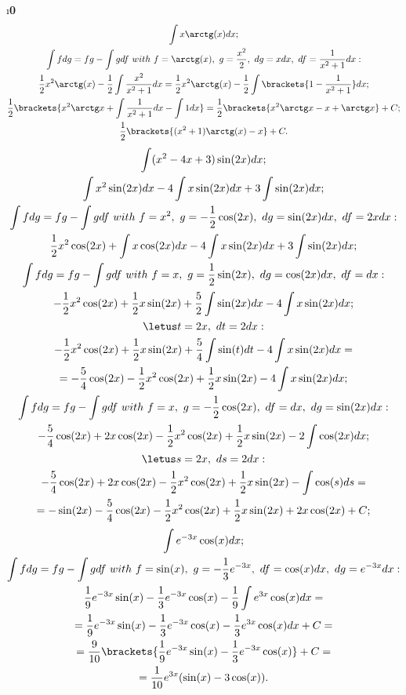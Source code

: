 \i \textbf{0}
\pu
\begin{gather*}
    \int x\arctg(x)dx;\\
    \int f dg = fg - \int g df\ with\ f=\arctg(x),\ g = \frac{x^2}{2},\ dg = xdx,\ df = \frac{1}{x^2+1}dx:\\
    \frac{1}{2}x^2\arctg(x) - \frac{1}{2}\int \frac{x^2}{x^2+1}dx = \frac{1}{2}x^2\arctg(x) - \frac{1}{2}\int \brackets{1 - \frac{1}{x^2+1}}dx;\\
    \frac{1}{2}\brackets{x^2\arctg x + \int \frac{1}{x^2 + 1}dx - \int 1dx} = \frac{1}{2}\brackets{x^2\arctg x - x + \arctg x} + C;\\
    \frac{1}{2}\brackets{(x^2+1)\arctg(x) - x} + C.
\end{gather*}
\pu
\begin{gather*}
    \int (x^2-4x+3)\sin(2x)dx;\\
    \int x^2\sin(2x)dx - 4\int x\sin(2x)dx + 3\int \sin(2x)dx;\\
    \int fdg = fg - \int gdf\ with\ f = x^2,\ g = -\frac{1}{2}\cos(2x),\ dg = \sin(2x)dx,\ df = 2xdx:\\
    \frac{1}{2}x^2\cos(2x) + \int x\cos(2x)dx - 4\int x\sin(2x)dx + 3\int \sin(2x)dx;\\
    \int fdg = fg - \int gdf\ with\ f = x,\ g = \frac{1}{2}\sin(2x),\ dg = \cos(2x)dx,\ df = dx:\\
    -\frac{1}{2}x^2\cos(2x) + \frac{1}{2}x\sin(2x) + \frac{5}{2}\int \sin(2x)dx - 4\int x\sin(2x)dx;\\
    \letus t = 2x,\ dt = 2dx:\\
    -\frac{1}{2}x^2\cos(2x) + \frac{1}{2}x\sin(2x) + \frac{5}{4}\int \sin(t)dt - 4\int x\sin(2x)dx = \\
    = -\frac{5}{4}\cos(2x) - \frac{1}{2}x^2\cos(2x) + \frac{1}{2}x\sin(2x) - 4\int x\sin(2x)dx;\\
    \int fdg = fg - \int gdf\ with\ f = x,\ g = -\frac{1}{2}\cos(2x),\ df = dx,\ dg = \sin(2x)dx:\\
    -\frac{5}{4}\cos(2x) + 2x\cos(2x) - \frac{1}{2}x^2\cos(2x) + \frac{1}{2}x\sin(2x) - 2\int \cos(2x)dx;\\
    \letus s = 2x,\ ds = 2dx:\\
    -\frac{5}{4}\cos(2x) + 2x\cos(2x) - \frac{1}{2}x^2\cos(2x) + \frac{1}{2}x\sin(2x) - \int \cos(s)ds = \\
    = -\sin(2x) - \frac{5}{4}\cos(2x) - \frac{1}{2}x^2\cos(2x) + \frac{1}{2}x\sin(2x) + 2x\cos(2x) + C;
\end{gather*}
\pu
\begin{gather*}
    \int e^{-3x}\cos(x) dx;\\
    \int fdg = fg - \int gdf\ with\ f = \sin(x),\ g = -\frac{1}{3}e^{-3x},\ df = \cos(x)dx,\ dg = e^{-3x}dx:\\
    \frac{1}{9}e^{-3x}\sin(x) - \frac{1}{3}e^{-3x}\cos(x) - \frac{1}{9}\int e^{3x}\cos(x)dx = \\
    =  \frac{1}{9}e^{-3x}\sin(x) - \frac{1}{3}e^{-3x}\cos(x) - \frac{1}{3} e^{3x}\cos(x)dx + C = \\
    = \frac{9}{10}\brackets{\frac{1}{9}e^{-3x}\sin(x) - \frac{1}{3}e^{-3x}\cos(x)} + C = \\
    = \frac{1}{10}e^{3x}(\sin(x) - 3\cos(x)).
\end{gather*}
